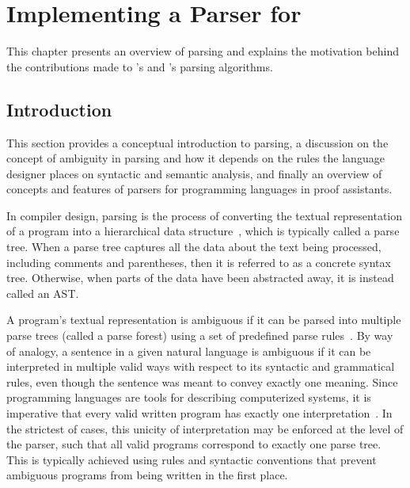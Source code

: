\chapter{Implementing a Parser for \Beluga}

This chapter presents an overview of parsing and explains the motivation behind the contributions made to \Beluga's and \Harpoon's parsing algorithms.

\section{Introduction}

This section provides a conceptual introduction to parsing, a discussion on the concept of ambiguity in parsing and how it depends on the rules the language designer places on syntactic and semantic analysis, and finally an overview of concepts and features of parsers for programming languages in proof assistants.


In compiler design, parsing is the process of converting the textual representation of a program into a hierarchical data structure~\cite{aho2007compilers, afroozeh2019practical}, which is typically called a parse tree.
When a parse tree captures all the data about the text being processed, including comments and parentheses, then it is referred to as a concrete syntax tree.
Otherwise, when parts of the data have been abstracted away, it is instead called an \ac{AST}.


A program's textual representation is ambiguous if it can be parsed into multiple parse trees (called a parse forest) using a set of predefined parse rules~\cite{aho2007compilers}.
By way of analogy, a sentence in a given natural language is ambiguous if it can be interpreted in multiple valid ways with respect to its syntactic and grammatical rules, even though the sentence was meant to convey exactly one meaning.
Since programming languages are tools for describing computerized systems, it is imperative that every valid written program has exactly one interpretation~\cite{aho2007compilers}.
In the strictest of cases, this unicity of interpretation may be enforced at the level of the parser, such that all valid programs correspond to exactly one parse tree.
This is typically achieved using rules and syntactic conventions that prevent ambiguous programs from being written in the first place.

